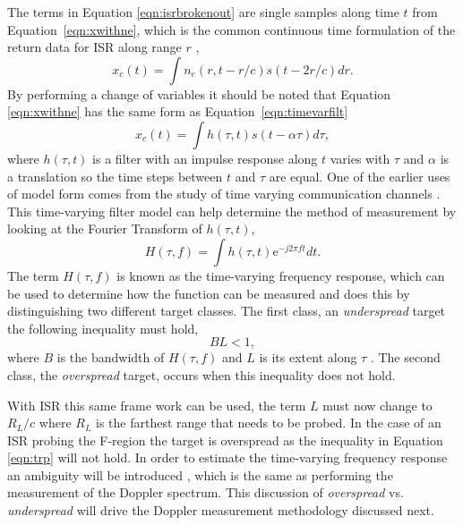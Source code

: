 The terms in Equation \ref{eqn:isrbrokenout} are single samples along time $t$ from Equation~\ref{eqn:xwithne}, which is the common continuous time formulation of the return data for ISR along range $r$ \citep{hysell2008}, 
\begin{equation}
\label{eqn:xwithne}
x_c(t)= \int n_e(r,t-r/c)s(t-2r/c)  dr.
\end{equation}
By performing a change of variables it should be noted that Equation \ref{eqn:xwithne} has the same form as Equation~\ref{eqn:timevarfilt}
\begin{equation}
\label{eqn:timevarfilt}
x_c(t)= \int h(\tau,t)s(t-\alpha\tau)  d\tau,
\end{equation}
where $h(\tau,t)$ is a filter with an impulse response along $t$ varies with $\tau$ and $\alpha$ is a translation so the time steps between $t$ and $\tau$ are equal.  One of the earlier uses of model  form comes from the study of time varying communication channels \citep{Kailath:1962jx,Kailath:1963gh}. This time-varying filter model can help determine the method of measurement by looking at the Fourier Transform of $h(\tau,t)$,
\begin{equation}
\label{eqn:timvarefreq}
H(\tau,f)=\int h(\tau,t)\text{e}^{-j2\pi ft}dt.
\end{equation}
The term $H(\tau,f)$ is known as the time-varying frequency response, which can be used to determine how the function can be measured and does this by distinguishing two different target classes. The first class, an \textit{underspread} target the following inequality must hold,
\begin{equation}
\label{eqn:trp}
BL<1,
\end{equation}
where $B$ is the bandwidth of $H(\tau,f)$ and $L$ is its extent along $\tau$ \citep{Kay:2003jl,Pfander:2015ea}. The second class, the \textit{overspread} target, occurs when this inequality does not hold.

With ISR this same frame work can be used, the term $L$ must now change to $R_L/c$ where $R_L$ is the farthest range that needs to be probed. In the case of an ISR probing the F-region the target is overspread as the inequality in Equation \ref{eqn:trp} will not hold. In order to estimate the time-varying frequency response an ambiguity will be introduced \citep{Kailath:1962jx,Kailath:1963gh}, which is the same as performing the measurement of the Doppler spectrum. This discussion of \textit{overspread} vs. \textit{underspread} will drive the Doppler measurement methodology discussed next.




